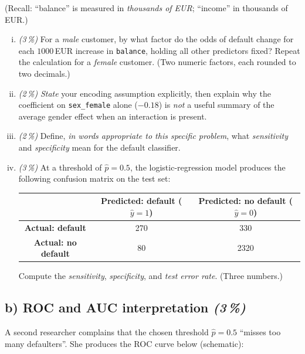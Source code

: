 \documentclass[11pt,a4paper]{article}
\newcommand{\subpoints}[1]{\textit{(#1\,\%)}}
\begin{document}
\noindent (Recall: ``balance'' is measured in \emph{thousands of EUR}; ``income'' in thousands of EUR.)

\begin{enumerate}[(i)]
  \item \subpoints{3} For a \emph{male} customer, by what factor do the odds of default change for each $1000$\,EUR increase in \texttt{balance}, holding all other predictors fixed? Repeat the calculation for a \emph{female} customer. (Two numeric factors, each rounded to two decimals.)
  \item \subpoints{2} \emph{State} your encoding assumption explicitly, then explain why the coefficient on \texttt{sex\_female} alone ($-0.18$) is \emph{not} a useful summary of the average gender effect when an interaction is present.
  \item \subpoints{2} Define, \emph{in words appropriate to this specific problem}, what \emph{sensitivity} and \emph{specificity} mean for the default classifier.
  \item \subpoints{3} At a threshold of $\hat p = 0.5$, the logistic-regression model produces the following confusion matrix on the test set:
  \begin{center}\small
  \begin{tabular}{c|cc}
   & \textbf{Predicted: default ($\hat y = 1$)} & \textbf{Predicted: no default ($\hat y = 0$)} \\ \hline
  \textbf{Actual: default}    & 270  & 330 \\
  \textbf{Actual: no default} & 80   & 2320 \\
  \end{tabular}
  \end{center}
  Compute the \emph{sensitivity}, \emph{specificity}, and \emph{test error rate}. (Three numbers.)
\end{enumerate}

\subsection*{b) ROC and AUC interpretation \subpoints{3}}

A second researcher complains that the chosen threshold $\hat p = 0.5$ ``misses too many defaulters''. She produces the ROC curve below (schematic):

\begin{center}
\end{center}
\end{document}
